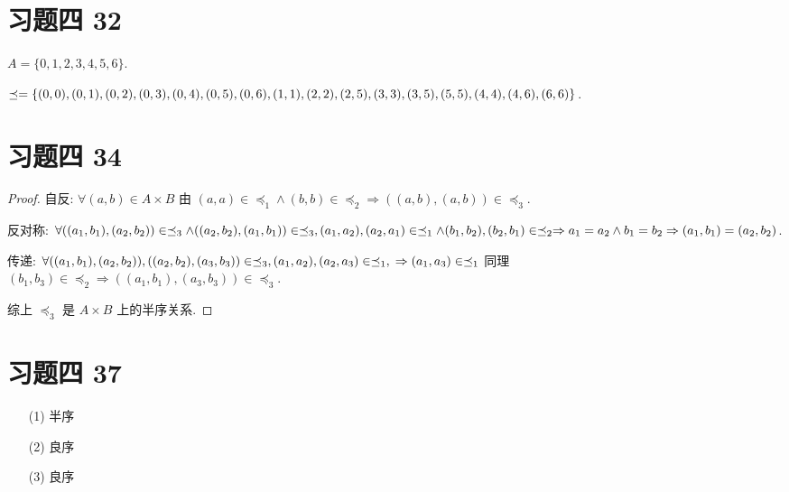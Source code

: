 \section{习题四 32}

\begin{solution}
	$A=\{0,1,2,3,4,5,6\}$.
	
	$\preceq=\{(0,0),(0,1),(0,2),(0,3),(0,4),(0,5),(0,6),(1,1),\\(2,2),(2,5),(3,3),(3,5),(5,5),(4,4),(4,6),(6,6)\}$.
\end{solution}

\section{习题四 34}

\begin{proof}
	自反: $\forall (a,b) \in A\times B$ 由 $(a,a) \in \preceq_1 \wedge (b,b) \in \preceq_2 \Rightarrow ((a,b),(a,b)) \in \preceq_3$.
	
	反对称: $\forall ((a_1,b_1),(a_2,b_2)) \in \preceq_3 \wedge ((a_2,b_2),(a_1,b_1)) \in \preceq_3, \\ (a_1,a_2),(a_2,a_1) \in \preceq_1 \wedge (b_1,b_2),(b_2,b_1) \in \preceq_2 \Rightarrow a_1=a_2\wedge b_1=b_2 \Rightarrow (a_1,b_1)=(a_2,b_2)$.
	
	传递: $\forall ((a_1,b_1),(a_2,b_2)),((a_2,b_2),(a_3,b_3)) \in \preceq_3, (a_1,a_2),(a_2,a_3) \in \preceq_1, \\ \Rightarrow (a_1,a_3)\in \preceq_1$ 同理 $(b_1,b_3) \in \preceq_2 \Rightarrow ((a_1,b_1),(a_3,b_3)) \in \preceq_3$.
	
	综上 $\preceq_3$ 是 $A\times B$ 上的半序关系.
\end{proof}

\section{习题四 37}

\begin{solution}
	\begin{itemize}
		\item[(1)] 半序
		\item[(2)] 良序
		\item[(3)] 良序
	\end{itemize}
\end{solution}